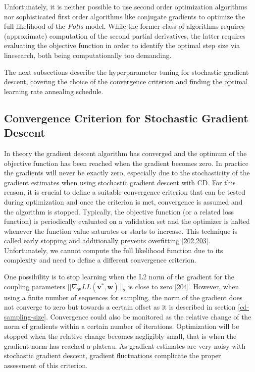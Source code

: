 \documentclass[11pt,a4paper,twoside]{book}
\renewcommand{\v}{\mathbf{v}}
\newcommand{\w}{\mathbf{w}}
\theoremstyle{definition}
\theoremstyle{definition}
\theoremstyle{remark}
\begin{document}
Unfortunately, it is neither possible to use second order optimization
algorithms nor sophisticated first order algorithms like conjugate
gradients to optimize the full likelihood of the \emph{Potts} model.
While the former class of algorithms requires (approximate) computation
of the second partial derivatives, the latter requires evaluating the
objective function in order to identify the optimal step size via
linesearch, both being computationally too demanding.

The next subsections describe the hyperparameter tuning for stochastic
gradient descent, covering the choice of the convergence criterion and
finding the optimal learning rate annealing schedule.

\subsection{Convergence Criterion for Stochastic Gradient
Descent}\label{convergence-criteria-sgd}

In theory the gradient descent algorithm has converged and the optimum
of the objective function has been reached when the gradient becomes
zero. In practice the gradients will never be exactly zero, especially
due to the stochasticity of the gradient estimates when using stochastic
gradient descent with \protect\hyperlink{abbrev}{CD}. For this reason,
it is crucial to define a suitable convergence criterion that can be
tested during optimization and once the criterion is met, convergence is
assumed and the algorithm is stopped. Typically, the objective function
(or a related loss function) is periodically evaluated on a validation
set and the optimizer is halted whenever the function value saturates or
starts to increase. This technique is called early stopping and
additionally prevents overfitting
{[}\protect\hyperlink{ref-Bengio2012}{202},\protect\hyperlink{ref-Mahsereci2017}{203}{]}.
Unfortunately, we cannot compute the full likelihood function due to its
complexity and need to define a different convergence criterion.

One possibility is to stop learning when the L2 norm of the gradient for
the coupling parameters \(||\nabla_{\w} L\!L(\v^*, \w)||_2\) is close to
zero {[}\protect\hyperlink{ref-Carreira-Perpinan2005}{204}{]}. However,
when using a finite number of sequences for sampling, the norm of the
gradient does not converge to zero but towards a certain offset as it is
described in section \ref{cd-sampling-size}. Convergence could also be
monitored as the relative change of the norm of gradients within a
certain number of iterations. Optimization will be stopped when the
relative change becomes negligibly small, that is when the gradient norm
has reached a plateau. As gradient estimates are very noisy with
stochastic gradient descent, gradient fluctuations complicate the proper
assessment of this criterion.
\end{document}
